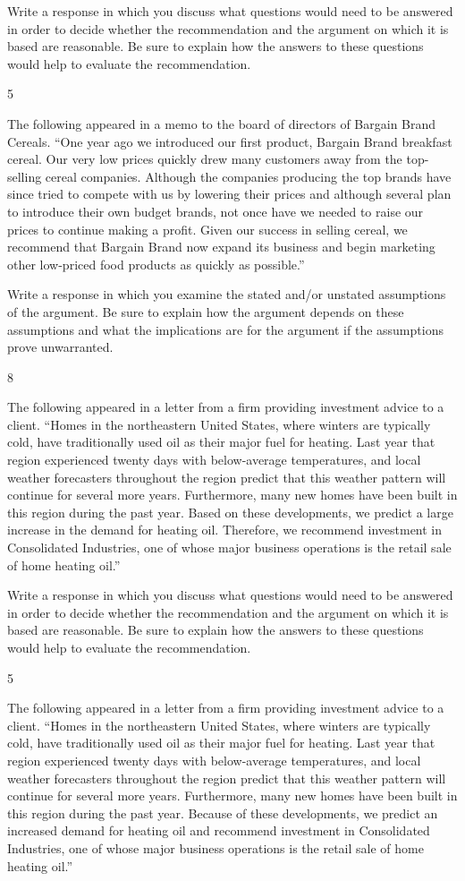 \documentclass[]{article}
\begin{document}
Write a response in which you discuss what questions would need to be
answered in order to decide whether the recommendation and the argument
on which it is based are reasonable. Be sure to explain how the answers
to these questions would help to evaluate the recommendation.

5

The following appeared in a memo to the board of directors of Bargain
Brand Cereals. ``One year ago we introduced our first product, Bargain
Brand breakfast cereal. Our very low prices quickly drew many customers
away from the top-selling cereal companies. Although the companies
producing the top brands have since tried to compete with us by lowering
their prices and although several plan to introduce their own budget
brands, not once have we needed to raise our prices to continue making a
profit. Given our success in selling cereal, we recommend that Bargain
Brand now expand its business and begin marketing other low-priced food
products as quickly as possible.''

Write a response in which you examine the stated and/or unstated
assumptions of the argument. Be sure to explain how the argument depends
on these assumptions and what the implications are for the argument if
the assumptions prove unwarranted.

8

The following appeared in a letter from a firm providing investment
advice to a client. ``Homes in the northeastern United States, where
winters are typically cold, have traditionally used oil as their major
fuel for heating. Last year that region experienced twenty days with
below-average temperatures, and local weather forecasters throughout the
region predict that this weather pattern will continue for several more
years. Furthermore, many new homes have been built in this region during
the past year. Based on these developments, we predict a large increase
in the demand for heating oil. Therefore, we recommend investment in
Consolidated Industries, one of whose major business operations is the
retail sale of home heating oil.''

Write a response in which you discuss what questions would need to be
answered in order to decide whether the recommendation and the argument
on which it is based are reasonable. Be sure to explain how the answers
to these questions would help to evaluate the recommendation.

5

The following appeared in a letter from a firm providing investment
advice to a client. ``Homes in the northeastern United States, where
winters are typically cold, have traditionally used oil as their major
fuel for heating. Last year that region experienced twenty days with
below-average temperatures, and local weather forecasters throughout the
region predict that this weather pattern will continue for several more
years. Furthermore, many new homes have been built in this region during
the past year. Because of these developments, we predict an increased
demand for heating oil and recommend investment in Consolidated
Industries, one of whose major business operations is the retail sale of
home heating oil.''
\end{document}
